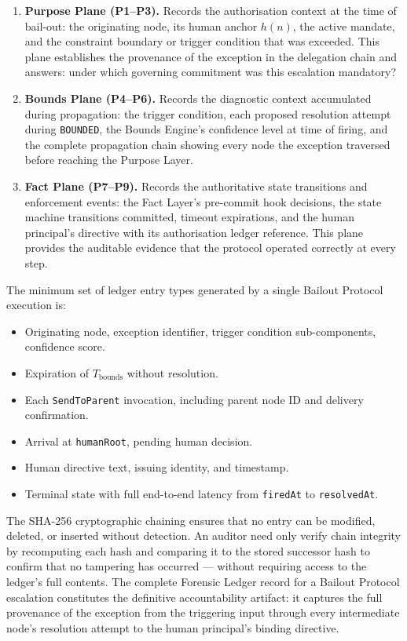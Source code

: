 \begin{enumerate}\itemsep=0pt
  \item \textbf{Purpose Plane (P1–P3).} Records the authorisation context at the time of bail-out: the originating node, its human anchor $h(n)$, the active mandate, and the constraint boundary or trigger condition that was exceeded. This plane establishes the provenance of the exception in the delegation chain and answers: under which governing commitment was this escalation mandatory?
  \item \textbf{Bounds Plane (P4–P6).} Records the diagnostic context accumulated during propagation: the trigger condition, each proposed resolution attempt during \texttt{BOUNDED}, the Bounds Engine's confidence level at time of firing, and the complete propagation chain showing every node the exception traversed before reaching the Purpose Layer.
  \item \textbf{Fact Plane (P7–P9).} Records the authoritative state transitions and enforcement events: the Fact Layer's pre-commit hook decisions, the state machine transitions committed, timeout expirations, and the human principal's directive with its authorisation ledger reference. This plane provides the auditable evidence that the protocol operated correctly at every step.
\end{enumerate}

The minimum set of ledger entry types generated by a single Bailout Protocol execution is:

\begin{itemize}\itemsep=0pt
  \item[\texttt{bailout-trigger}] Originating node, exception identifier, trigger condition sub-components, confidence score.
  \item[\texttt{timeout-bounds-expired}] Expiration of $T_{\text{bounds}}$ without resolution.
  \item[\texttt{parent-escalation}] Each \texttt{SendToParent} invocation, including parent node ID and delivery confirmation.
  \item[\texttt{human-acknowledged}] Arrival at \texttt{humanRoot}, pending human decision.
  \item[\texttt{human-directive}] Human directive text, issuing identity, and timestamp.
  \item[\texttt{resolved}] Terminal state with full end-to-end latency from \texttt{firedAt} to \texttt{resolvedAt}.
\end{itemize}

The SHA-256 cryptographic chaining ensures that no entry can be modified, deleted, or inserted without detection. An auditor need only verify chain integrity by recomputing each hash and comparing it to the stored successor hash to confirm that no tampering has occurred — without requiring access to the ledger's full contents. The complete Forensic Ledger record for a Bailout Protocol escalation constitutes the definitive accountability artifact: it captures the full provenance of the exception from the triggering input through every intermediate node's resolution attempt to the human principal's binding directive.

